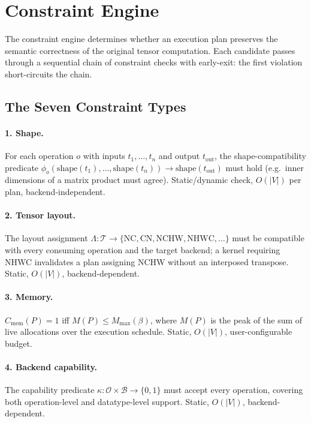 \section{Constraint Engine}
\label{sec:constraint-engine}

The constraint engine determines whether an execution plan preserves the
semantic correctness of the original tensor computation. Each candidate
passes through a sequential chain of constraint checks with early-exit:
the first violation short-circuits the chain.

\subsection{The Seven Constraint Types}

\paragraph{1. Shape.}
For each operation $o$ with inputs $t_1, \ldots, t_n$ and output
$t_{\text{out}}$, the shape-compatibility predicate
$\phi_o(\text{shape}(t_1), \ldots, \text{shape}(t_n)) \to
\text{shape}(t_{\text{out}})$ must hold (e.g.\ inner dimensions of a
matrix product must agree). Static/dynamic check, $O(|V|)$ per plan,
backend-independent.

\paragraph{2. Tensor layout.}
The layout assignment $\Lambda: \mathcal{T} \to \{\text{NC}, \text{CN},
\text{NCHW}, \text{NHWC}, \ldots\}$ must be compatible with every
consuming operation and the target backend; a kernel requiring NHWC
invalidates a plan assigning NCHW without an interposed transpose.
Static, $O(|V|)$, backend-dependent.

\paragraph{3. Memory.}
$C_{\text{mem}}(P) = 1$ iff $M(P) \leq M_{\max}(\beta)$, where $M(P)$
is the peak of the sum of live allocations over the execution schedule.
Static, $O(|V|)$, user-configurable budget.

\paragraph{4. Backend capability.}
The capability predicate $\kappa: \mathcal{O} \times \mathcal{B} \to
\{0,1\}$ must accept every operation, covering both operation-level and
datatype-level support. Static, $O(|V|)$, backend-dependent.

